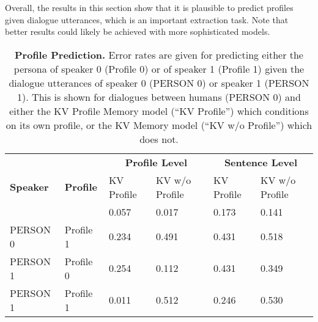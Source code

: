 Overall, the results in this section 
show that it is plausible to predict profiles given dialogue utterances, which is
an important extraction task. Note that better results could likely be achieved with more sophisticated models.




\begin{table*}[t]
  \centering
  \begin{tabular}{ll|ll|ll}
  \toprule
  \multirow{3}{*}{\textbf{Speaker}} & 
  \multirow{3}{*}{\textbf{Profile}} & 
   \multicolumn{2}{c}{\textbf{Profile Level}} &   \multicolumn{2}{c}{\textbf{Sentence Level}} \\
&   &  KV Profile & KV w/o Profile    &  KV Profile & KV w/o  Profile \\
  \midrule
PERSON 0 & Profile 0  &  0.057  &  0.017  & 0.173 & 0.141 \\
PERSON 0 & Profile 1  &  0.234  &  0.491 & 0.431 & 0.518 \\
PERSON 1 & Profile 0  &  0.254  &  0.112  & 0.431 & 0.349 \\
PERSON 1 & Profile 1  &  0.011  &  0.512  & 0.246 & 0.530 \\
  \bottomrule
  \end{tabular}
  \caption{{\bf Profile Prediction.}
     \label{tab:task2a}
  Error rates are given for predicting either the persona of speaker 0 (Profile 0) or
of speaker 1 (Profile 1) given the dialogue utterances of speaker 0 (PERSON 0) or speaker
1 (PERSON 1). This is shown for dialogues between humans (PERSON 0) and either the 
KV Profile Memory model (``KV Profile'') which conditions on its own profile, or
the KV Memory model (``KV w/o Profile'') which does not.
  }
\end{table*}



